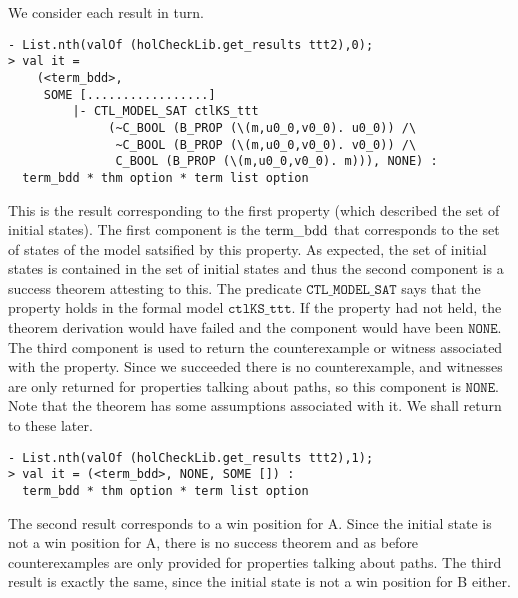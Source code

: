 We consider each result in turn.

\begin{session}\begin{verbatim}
- List.nth(valOf (holCheckLib.get_results ttt2),0);
> val it =
    (<term_bdd>,
     SOME [.................]
         |- CTL_MODEL_SAT ctlKS_ttt
              (~C_BOOL (B_PROP (\(m,u0_0,v0_0). u0_0)) /\
               ~C_BOOL (B_PROP (\(m,u0_0,v0_0). v0_0)) /\
               C_BOOL (B_PROP (\(m,u0_0,v0_0). m))), NONE) :
  term_bdd * thm option * term list option
\end{verbatim}\end{session}

This is the result corresponding to the first property (which described the set of initial states).  The first component is the \(\textup{term\_bdd}\) that corresponds to the set of states of the model satsified by this property. As expected, the set of initial states is contained in the set of initial states and thus the second component is a success theorem attesting to this. The predicate \( \mathtt{CTL\_MODEL\_SAT} \) says that the property holds in the formal model \( \mathtt{ctlKS\_ttt}\). If the property had not held, the theorem derivation would have failed and the component would have been \( \mathtt{NONE}\). The third component is used to return the counterexample or witness associated with the property. Since we succeeded there is no counterexample, and witnesses are only returned for properties talking about paths, so this component is \( \mathtt{NONE}\). Note that the theorem has some assumptions associated with it. We shall return to these later.

\begin{session}\begin{verbatim}
- List.nth(valOf (holCheckLib.get_results ttt2),1);
> val it = (<term_bdd>, NONE, SOME []) :
  term_bdd * thm option * term list option
\end{verbatim}\end{session}

The second result corresponds to a win position for A. Since the initial state is not a win position for A, there is no success theorem and as before counterexamples are only provided for properties talking about paths. The third result is exactly the same, since the initial state is not a win position for B either.

